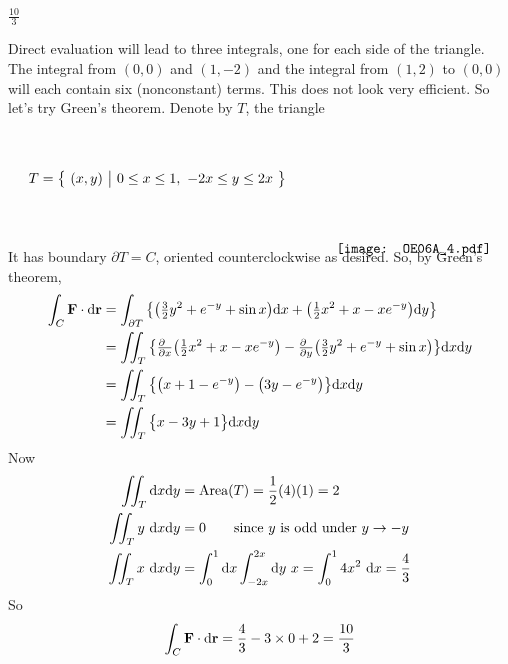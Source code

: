 \begin{answer} 
$\frac{10}{3}$
\end{answer}

\begin{solution}
Direct evaluation will lead to three integrals, one for each side of the 
triangle. The integral from $(0,0)$ and $(1,-2)$ and the integral from 
$(1,2)$ to $(0,0)$ will each contain six (nonconstant) terms. This 
does not look very efficient.
So let's try Green's theorem. Denote by $T$, the triangle
\begin{equation*}
T = \Set{(x,y)}{0\le x\le 1,\ -2x\le y\le 2x} \hskip0.5in
\raisebox{-50pt}[40pt][40pt]{\texttt{[image: OE06A\_4.pdf]}}
\end{equation*}
It has boundary $\partial T=C$, oriented counterclockwise as desired.
So, by Green's theorem,
\begin{align*}
\int_C \vF\cdot\dee{\vr}
&= \int_{\partial T} \big\{\big(\tfrac{3}{2}y^2 + e^{-y} +\sin x\big)\dee{x}
               +\big(\tfrac{1}{2}x^2+x-x e^{-y}\big)\dee{y}\big\} \\
&= \dblInt_T \big\{
    \tfrac{\partial\hfill}{\partial x}\big(\tfrac{1}{2}x^2+x-x e^{-y}\big)
   -\tfrac{\partial\hfill}{\partial y}\big(\tfrac{3}{2}y^2 + e^{-y} +\sin x\big)
               \big\}\dee{x}\dee{y}
\\
&= \dblInt_T \big\{
             \big(x + 1-e^{-y}\big)
           - \big(3y - e^{-y} \big)
               \big\}\dee{x}\dee{y} \\
&= \dblInt_T \big\{ x -3y + 1 \big\}\dee{x}\dee{y} 
\end{align*}
Now 
\begin{align*}
\iint_T  \mathrm{d}x\mathrm{d}y &=\text{Area}(T) = \frac{1}{2}(4)(1) = 2 \\
\iint_T  y\ \mathrm{d}x\mathrm{d}y &= 0
   \qquad\text{since $y$ is odd under $y\rightarrow-y$} \\
\iint_T  x\ \mathrm{d}x\mathrm{d}y 
&=\int_0^1\mathrm{d}x\int_{-2x}^{2x} \mathrm{d}y\ x
 =\int_0^1 4x^2\ \mathrm{d}x 
 =\frac{4}{3}
\end{align*}
So
\begin{equation*}
\int_C \mathbf{F}\cdot\mathrm{d}\mathbf{r} = \frac{4}{3}-3\times 0 +2 =\frac{10}{3}
\end{equation*}
\end{solution}

